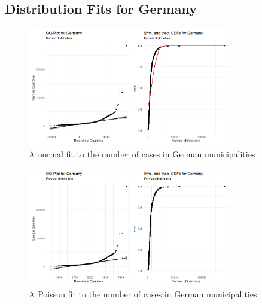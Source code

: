 \subsection{Distribution Fits for Germany}
\begin{figure}[H]
    \centering
    \includegraphics[width = 0.8\textwidth]{fit_normal_germany.png}
    \caption{A normal fit to the number of cases in German municipalities}
    \label{fitNormalGermany}
\end{figure}
\begin{figure}[H]
    \centering
    \includegraphics[width = 0.8\textwidth]{fit_poisson_germany.png}
    \caption{A Poisson fit to the number of cases in German municipalities}
    \label{fitPoissonGermany}
\end{figure}
